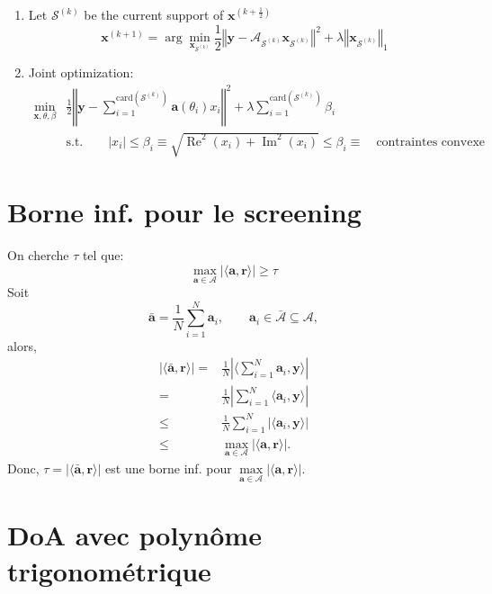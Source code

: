 \documentclass{article}
\renewcommand{\vec}[1]{\ensuremath{\bm{#1}}}
\newcommand{\y}{\vec{y}}
\newcommand{\dico}{\ensuremath{\mathcal{A}}}
\newcommand{\atom}{\ensuremath{\vec{a}}}
\newcommand{\x}{\vec{x}}
\renewcommand{\r}{\vec{r}}
\newcommand{\supp}{\ensuremath{\mathcal{S}}}
\newcommand{\card}[1]{\ensuremath{\text{card}\left(#1\right)}}
\newcommand{\abs}[1]{\ensuremath{\left|#1\right|}}
\newcommand{\norm}[1]{\ensuremath{\left\Vert#1\right\Vert}}
\newcommand{\normUn}[1]{\ensuremath{\left\Vert#1\right\Vert_1}}
\newcommand{\scalprod}[2]{\ensuremath{\langle#1,#2\rangle}}
\newcommand{\aml}[1]{\ensuremath{\arg\min\limits_{#1}}}
\renewcommand{\Re}{\operatorname{Re}}
\renewcommand{\Im}{\operatorname{Im}}
\begin{document}
\begin{enumerate}
		\item Let $\supp^{(k)}$ be the current support of $\x^{(k+\frac{1}{2})}$
		\begin{equation}
			\x^{(k+1)}=\aml{\x_{\supp^{(k)}}}\frac{1}{2}\norm{\y-\dico_{\supp^{(k)}}\x_{\supp^{(k)}}}^2+\lambda\normUn{\x_{\supp^{(k)}}}
		\end{equation}
		
		\item Joint optimization:
		\begin{align}
			\min\limits_{\x,\theta,\beta}&\frac{1}{2}\norm{\y-\sum_{i=1}^{\card{\supp^{(k)}}}\atom(\theta_i)x_i}^2+\lambda\sum_{i=1}^{\card{\supp^{(k)}}}\beta_i\\
			&\text{s.t.}\qquad \abs{x_i}\leq\beta_i\equiv\sqrt{\Re^2(x_i)+\Im^2(x_i)}\leq\beta_i\equiv\quad\text{contraintes convexe}
		\end{align}
		
	\end{enumerate}
	
	\newpage	
	\section*{Borne inf. pour le screening}
	
	On cherche $\tau$ tel que:
	\begin{equation*}
		\max\limits_{\atom\in\dico}\abs{\scalprod{\atom}{\r}}\geq\tau
	\end{equation*}
	Soit 
	\begin{equation*}
		\bar{\atom}=\frac{1}{N}\sum\limits_{i=1}^N \atom_i,\qquad \atom_i\in\bar{\dico}\subseteq\dico,
	\end{equation*}
	alors,
	\begin{align*}
		\abs{\scalprod{\bar{\atom}}{\r}} = & \frac{1}{N}\abs{\scalprod{\sum\limits_{i=1}^N \atom_i}{\y}}\\
		=  & \frac{1}{N}\abs{\sum\limits_{i=1}^N\scalprod{ \atom_i}{\y}}\\
		\leq & \frac{1}{N}\sum\limits_{i=1}^N\abs{\scalprod{\atom_i}{\y}}\\
		\leq & \max\limits_{\atom\in\dico}\abs{\scalprod{\atom}{\r}}.
	\end{align*}
	Donc, $\tau=\abs{\scalprod{\bar{\atom}}{\r}}$ est une borne inf. pour $\max\limits_{\atom\in\dico}\abs{\scalprod{\atom}{\r}}$.
	
	
	\section*{DoA avec polynôme trigonométrique} 
	
\end{document}
